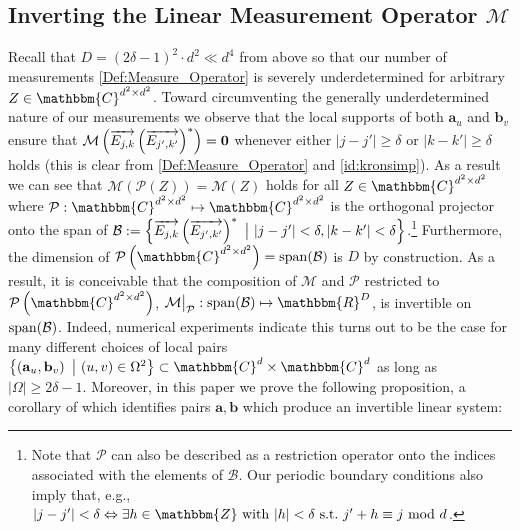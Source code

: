 \documentclass[]{spie}  %
\def \vec{\overrightarrow}
\def \a {\mathbf a}
\def \b {\mathbf b}
\begin{document}
\subsection{Inverting the Linear Measurement Operator $\mathcal{M}$}
\label{sec:invert}
Recall that $D = (2\delta-1)^2 \cdot d^2 \ll d^4$ from above so that our number of measurements \eqref{Def:Measure_Operator} is severely underdetermined for arbitrary $Z \in \mathbbm{C}^{d^2 \times d^2}$.  %
Toward circumventing the generally underdetermined nature of our measurements we observe that the local supports of both $\a_u$ and $\b_v$ ensure that $\mathcal{M}\left( \vec{E_{j,k}} \left(\vec{E_{j',k'}} \right)^* \right) = {\bf 0}$ whenever either $|j - j'| \geq \delta$ or $|k - k'| \geq \delta$ holds (this is clear from \eqref{Def:Measure_Operator} and \eqref{id:kronsimp}).  As a result we can see that $\mathcal{M} \left( \mathcal{P} \left( Z \right) \right) = \mathcal{M} \left( Z \right)$ holds for all $Z \in \mathbbm{C}^{d^2 \times d^2}$ where $\mathcal{P}: \mathbbm{C}^{d^2 \times d^2} \mapsto \mathbbm{C}^{d^2 \times d^2}$ is the orthogonal projector onto the span of $\mathcal{B} := \left\{ \vec{E_{j,k}} \left(\vec{E_{j',k'}} \right)^* ~{\bf \big |}~  |j - j'| < \delta, |k - k'| < \delta \right\}$.\footnote{Note that $\mathcal{P}$ can also be described as a restriction operator onto the indices associated with the elements of $\mathcal{B}$.  Our periodic boundary conditions also imply that, e.g., $|j - j'| < \delta \Leftrightarrow \exists h \in \mathbbm{Z}~{\rm with}~ |h| < \delta~{\rm s.t.}~j' + h \equiv j ~{\rm mod}~d$.}  Furthermore, the dimension of $\mathcal{P} \left( \mathbbm{C}^{d^2 \times d^2} \right) = {\rm span}(\mathcal{B})$ is $D$ by construction.  As a result, it is conceivable that the composition of $\mathcal{M}$ and $\mathcal{P}$ restricted to $\mathcal{P} \left( \mathbbm{C}^{d^2 \times d^2} \right)$, $\mathcal{M} \big|_{\mathcal{P}}: {\rm span}(\mathcal{B}) \mapsto \mathbbm{R}^D$, is invertible on ${\rm span}(\mathcal{B})$.  Indeed, numerical experiments indicate this turns out to be the case for many different choices of local pairs $\left\{ \left( \a_u, \b_v \right) ~\big|~ (u,v) \in \Omega^2 \right\} \subset \mathbbm{C}^d \times \mathbbm{C}^d$ as long as $|\Omega| \geq 2\delta-1$. Moreover, in this paper we prove the following proposition, a corollary of which identifies pairs $\a, \b$ which produce an invertible linear system:
\end{document}
